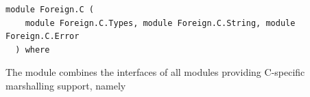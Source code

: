 \label{module:Foreign.C}
\haddockbeginheader
{\haddockverb\begin{verbatim}
module Foreign.C (
    module Foreign.C.Types, module Foreign.C.String, module Foreign.C.Error
  ) where\end{verbatim}}
\haddockendheader

The module  combines the interfaces of all modules providing
 C-specific marshalling support, namely\par
\begin{haddockdesc}
\item[\begin{tabular}{@{}l}
module Foreign.C.Types\\module Foreign.C.String\\module Foreign.C.Error
\end{tabular}]
\end{haddockdesc}